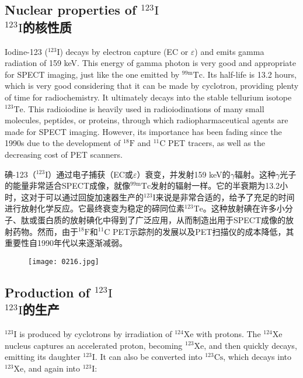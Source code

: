 \documentclass[dvipsnames, svgnames,a4paper,11pt]{article}
\begin{document}
\subsection{Nuclear properties of \(\mathrm{^{123}I}\)\\ \(\mathrm{^{123}I}\)的核性质}  

Iodine-123 (\(\mathrm{^{123}I}\)) decays by electron capture (EC or \(\varepsilon\)) and emits gamma radiation of 159 keV. This energy of gamma photon is very good and appropriate for SPECT imaging, just like the one emitted by \(\mathrm{^{99m}Tc}\). Its half-life is 13.2 hours, which is very good considering that it can be made by cyclotron, providing plenty of time for radiochemistry. It ultimately decays into the stable tellurium isotope \(\mathrm{^{123}Te}\). This radioiodine is heavily used in radioiodinations of many small molecules, peptides, or proteins, through which radiopharmaceutical agents are made for SPECT imaging. However, its importance has been fading since the 1990s due to the development of \(\mathrm{^{18}F}\) and \(\mathrm{^{11}C}\) PET tracers, as well as the decreasing cost of PET scanners.

碘-123（\(\mathrm{^{123}I}\)）通过电子捕获（EC或\(\varepsilon\)）衰变，并发射159 keV的$\gamma$辐射。这种$\gamma$光子的能量非常适合SPECT成像，就像\(\mathrm{^{99m}Tc}\)发射的辐射一样。它的半衰期为13.2小时，这对于可以通过回旋加速器生产的\(\mathrm{^{123}I}\)来说是非常合适的，给予了充足的时间进行放射化学反应。它最终衰变为稳定的碲同位素\(\mathrm{^{123}Te}\)。这种放射碘在许多小分子、肽或蛋白质的放射碘化中得到了广泛应用，从而制造出用于SPECT成像的放射药物。然而，由于\(\mathrm{^{18}F}\)和\(\mathrm{^{11}C}\) PET示踪剂的发展以及PET扫描仪的成本降低，其重要性自1990年代以来逐渐减弱。

\begin{figure}[h]
	\centering
    \texttt{[image: 0216.jpg]}  
     \label{fig270}
\end{figure}


\subsection{Production of \(\mathrm{^{123}I}\)\\ \(\mathrm{^{123}I}\)的生产}  
\(\mathrm{^{123}I}\) is produced by cyclotrons by irradiation of \(\mathrm{^{124}Xe}\) with protons. The \(\mathrm{^{124}Xe}\) nucleus captures an accelerated proton, becoming \(\mathrm{^{123}Xe}\), and then quickly decays, emitting its daughter \(\mathrm{^{123}I}\). It can also be converted into \(\mathrm{^{123}Cs}\), which decays into \(\mathrm{^{123}Xe}\), and again into \(\mathrm{^{123}I}\):
\end{document}

